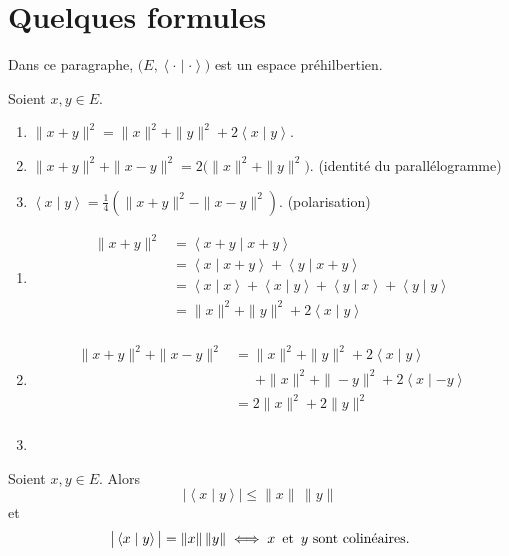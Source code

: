 \part{Quelques formules}

Dans ce paragraphe, $\big(E, \left<\cdot \mid \cdot \right>\big)$ est un espace préhilbertien.

\begin{prop}
	Soient $x, y \in E$.
	\begin{enumerate}
		\item $\|x+y\|^2 = \|x\|^2+\|y\|^2 + 2\left<x \mid y \right>$.
		\item $\|x+y\|^2 + \|x-y\|^2 = 2\big(\|x\|^2 + \|y\|^2\big)$. \hfill(identité du parallélogramme)
		\item $\left<x \mid y \right> = \textstyle\frac{1}{4}\left( \|x+y\|^2 - \|x-y\|^2 \right)$. \hfill (polarisation)
	\end{enumerate}
\end{prop}

\begin{prv}
	\begin{enumerate}
		\item
			\begin{align*}
				\|x + y\|^2 &= \left<x + y  \mid x + y \right> \\
				&= \left<x \mid x + y \right> + \left< y  \mid x + y \right> \\
				&= \left<x  \mid x \right> + \left<x \mid y \right> + \left<y \mid x \right> + \left<y  \mid y \right> \\
				&= \|x\|^2 + \|y\|^2 + 2\left<x  \mid y \right> \\
			\end{align*}
		\item
			\begin{align*}
				\|x+ y\|^2 + \|x - y\|^2 &= \|x\|^2 + \|y\|^2 + 2\left<x \mid y \right> \\
				&\phantom{=}\,+\|x\|^2 + \|-y\|^2 + 2\left<x \mid -y \right>\\
				&= 2\|x\|^2 + 2\|y\|^2 \\
			\end{align*}
		\item
	\end{enumerate}
\end{prv}

\begin{thm}
	Soient $x,y \in E$. Alors \[
		\big|\left<x \mid y \right>\big| \le \|x\|\,\|y\|
	\] et \[
		\big|\left<x \mid y \right>\big| = \|x\|\,\|y\| \iff x \operatorname{\text{ et }} y \text{ sont colinéaires}
	.\]
\end{thm}

